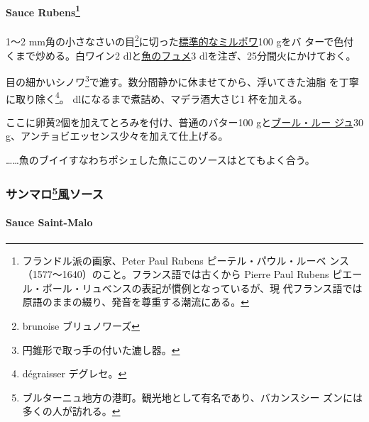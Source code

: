 \begin{recette}
\hypertarget{sauce-rubens122}{%
\paragraph[Sauce Rubens]{\texorpdfstring{Sauce Rubens\footnote{フランドル派の画家、Peter
  Paul Rubens ピーテル・パウル・ルーベ
  ンス（1577〜1640）のこと。フランス語では古くから Pierre Paul Rubens
  ピエール・ポール・リュベンスの表記が慣例となっているが、現
  代フランス語では原語のままの綴り、発音を尊重する潮流にある。}}{Sauce Rubens}}\label{sauce-rubens122}}


1〜2 mm角の小さなさいの目\footnote{brunoise ブリュノワーズ}に切った\protect\hyperlink{}{標準的なミルポワ}100
gをバ ターで色付くまで炒める。白ワイン2
dlと\protect\hyperlink{fumetux5cux2520deux5cux2520poisson}{魚のフュメ}3
dlを注ぎ、25分間火にかけておく。

目の細かいシノワ\footnote{円錐形で取っ手の付いた漉し器。}で漉す。数分間静かに休ませてから、浮いてきた油脂
を丁寧に取り除く\footnote{dégraisser デグレセ。}。\undemi{}
dlになるまで煮詰め、マデラ酒大さじ1 杯を加える。

ここに卵黄2個を加えてとろみを付け、普通のバター100
gと\protect\hyperlink{beurre-rouge}{ブール・ルー ジュ}30
g、アンチョビエッセンス少々を加えて仕上げる。

\ldots{}\ldots{}魚のブイイすなわちポシェした魚にこのソースはとてもよく合う。

\maeaki

\hypertarget{ux30b5ux30f3ux30deux30ed126ux98a8ux30bdux30fcux30b9}{%
\subsubsection[サンマロ風ソース]{\texorpdfstring{サンマロ\footnote{ブルターニュ地方の港町。観光地として有名であり、バカンスシー
  ズンには多くの人が訪れる。}風ソース}{サンマロ風ソース}}\label{ux30b5ux30f3ux30deux30ed126ux98a8ux30bdux30fcux30b9}}

\hypertarget{sauce-saint-malo}{%
\paragraph{Sauce Saint-Malo}\label{sauce-saint-malo}}



\end{recette}
